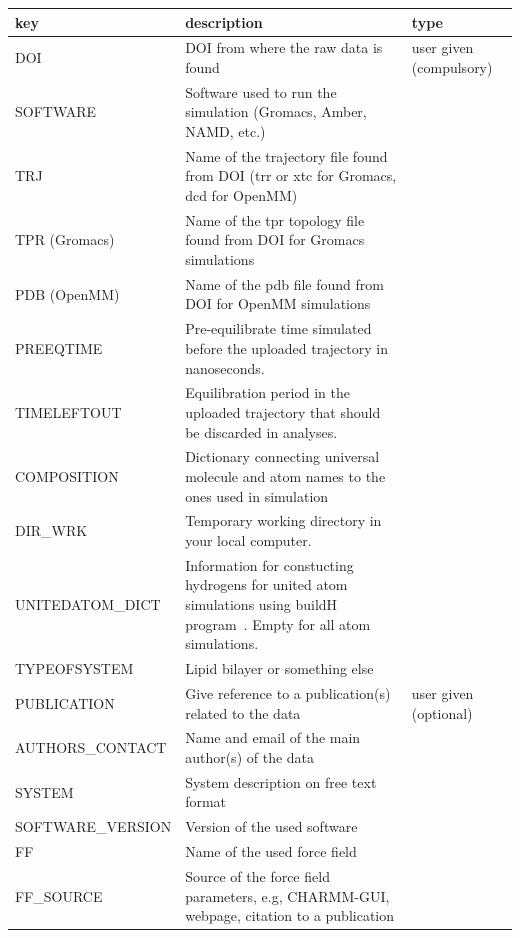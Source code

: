 \documentclass[fleqn,10pt]{wlscirepSI}
\begin{document}
\begin{table}[!h]
    \centering
    \begin{tabular}{  p{3.5cm}  p{9.5cm}  p{4.0cm} }
    \toprule
    key & description & type  \\
    \midrule
    DOI & DOI from where the raw data is found & user given (compulsory) \\
    SOFTWARE & Software used to run the simulation (Gromacs, Amber, NAMD, etc.) & \\
    TRJ & Name of the trajectory file found from DOI (trr or xtc for Gromacs, dcd for OpenMM) & \\
    TPR (Gromacs) & Name of the tpr topology file found from DOI for Gromacs simulations & \\
    PDB (OpenMM) & Name of the pdb file found from DOI for OpenMM simulations & \\
    PREEQTIME & Pre-equilibrate time simulated before the uploaded trajectory in nanoseconds. 
    & \\
    TIMELEFTOUT & Equilibration period in the uploaded trajectory that should be discarded in analyses. 
    & \\
    COMPOSITION & Dictionary connecting universal molecule and atom names to the ones used in simulation & \\
    DIR\_WRK & Temporary working directory in your local computer. \\
    UNITEDATOM\_DICT & Information for constucting hydrogens for united atom simulations using buildH program~\cite{santuz21}. Empty for all atom simulations. & \\
    TYPEOFSYSTEM & Lipid bilayer or something else & \\
    \hline
    PUBLICATION & Give reference to a publication(s) related to the data & user given (optional)\\
    AUTHORS\_CONTACT & Name and email of the main author(s) of the data & \\
    SYSTEM & System description on free text format & \\
    SOFTWARE\_VERSION & Version of the used software & \\
    FF & Name of the used force field & \\
    FF\_SOURCE & Source of the force field parameters, e.g, CHARMM-GUI, webpage, citation to a publication & \\

\end{tabular}
\end{table}
\end{document}
